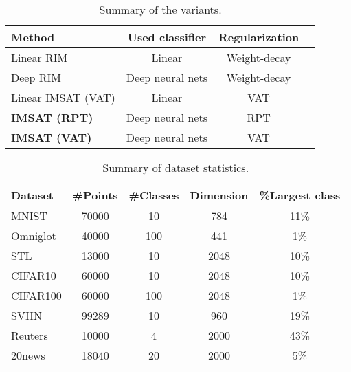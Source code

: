 \documentclass{article}
\theoremstyle{plain}
\begin{document}
\begin{table}[t] 
\caption{Summary of the variants.} \label{table:variant}
\footnotesize
\begin{center}
\begin{tabular}{|l||c|c|c|}\hline
Method & Used classifier & Regularization \\ \hline \hline
Linear RIM  &  Linear & Weight-decay  \\ \hline
Deep RIM & Deep neural nets  & Weight-decay \\ \hline
Linear IMSAT (VAT) & Linear & VAT \\ \hline
{\bf IMSAT (RPT)} & Deep neural nets & RPT \\ \hline
{\bf IMSAT (VAT)} & Deep neural nets & VAT \\ \hline
\end{tabular}
\label{table:clustering_omniglot}
\vspace*{-\baselineskip}
\end{center}
\end{table}

\begin{table*}[t]
\begin{center} 
\caption{Summary of dataset statistics.}
\begin{tabular}{|l||c|c|c|c|}\hline
\label{table:statistics}
Dataset & \#Points & \#Classes & Dimension & \%Largest class \\ \hline \hline
MNIST \citep{lecun1998gradient} & 70000  & 10 & 784 & 11\%  \\ \hline
Omniglot \citep{lake2011one} & 40000  & 100 & 441& 1\%\\ \hline
STL \citep{coates2010analysis}   & 13000 & 10 & 2048 & 10\%    \\  \hline
CIFAR10 \citep{torralba200880} & 60000  &10 &  2048 & 10\%   \\ \hline
CIFAR100  \citep{torralba200880} & 60000  &  100 & 2048 & 1\% \\ \hline
SVHN \citep{netzer2011reading} & 99289 &  10 & 960 & 19\% \\ \hline
Reuters \citep{lewis2004rcv1} & 10000 &  4 & 2000 & 43\% \\ \hline
20news \citep{Lang95} &18040 & 20 & 2000 & 5\% \\ \hline
\end{tabular}
\end{center} 
\end{table*}
\end{document}
